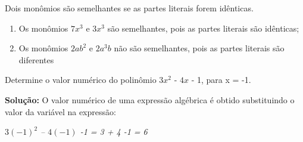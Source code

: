 \begin{tdefinicao}
Dois monômios são semelhantes se as partes literais forem idênticas.
\end{tdefinicao}

\begin{texemplo}
\begin{enumerate}[label=(\textbf{\alph*)}]
    \item Os monômios $7x^3$ e $3x^3$ são semelhantes, pois as partes literais são idênticas;
    
    \item Os monômios  $2ab^2$ e $2a^3b$ não são semelhantes, pois as partes literais são diferentes \qedsymbol
\end{enumerate}
\end{texemplo}

\begin{texemplo}

Determine o valor numérico do polinômio $3x^2$ - $4x$ - 1, para x = -1. 

\textbf{Solução:} O valor numérico de uma expressão algébrica é obtido substituindo o valor da variável na expressão:

\emph{$3(-1)^2$ – $4(-1)$ -1 = 3 + 4 -1 = 6} \qedsymbol
\end{texemplo}

